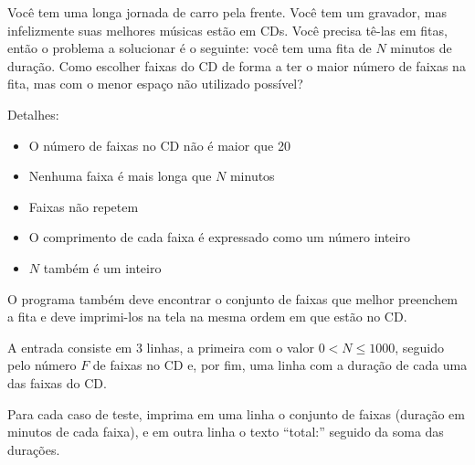 
%
%
%

Você tem uma longa jornada de carro pela frente. Você tem um gravador, mas infelizmente suas melhores músicas estão em CDs. Você precisa tê-las em fitas, então o problema a solucionar é o seguinte: você tem uma fita de $N$ minutos de duração. Como escolher faixas do CD de forma a ter o maior número de faixas na fita, mas com o menor espaço não utilizado possível?

Detalhes:
\begin{itemize}
	\item O número de faixas no CD não é maior que 20
	\item Nenhuma faixa é mais longa que $N$ minutos
	\item Faixas não repetem
	\item O comprimento de cada faixa é expressado como um número inteiro
	\item $N$ também é um inteiro
\end{itemize}

O programa também deve encontrar o conjunto de faixas que melhor preenchem a fita e deve imprimi-los na tela na mesma ordem em que estão no CD.

\Entrada%
A entrada consiste em 3 linhas, a primeira com o valor $0 < N \leq 1000$, seguido pelo número $F$ de faixas no CD e, por fim, uma linha com a duração de cada uma das faixas do CD.

\Saida%
Para cada caso de teste, imprima em uma linha o conjunto de faixas (duração em
minutos de cada faixa), e em outra linha o texto ``total:'' seguido da soma das durações.

%
